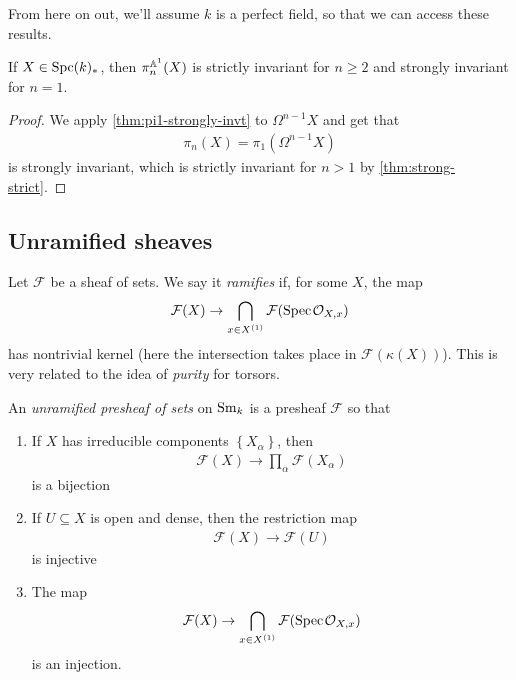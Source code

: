 \documentclass[11pt,openany]{book}
\begin{document}
\begin{assumption} From here on out, we'll assume $k$ is a perfect field, so that we can access these results.
\end{assumption}


\begin{corollary} If $X\in \mathrm{Spc}(k)_\ast$, then $\pi_n^{\mathbb{A}^1}(X)$ is strictly invariant for $n\ge 2$ and strongly invariant for $n=1$.
\end{corollary}
\begin{proof} We apply \autoref{thm:pi1-strongly-invt} to $\Omega^{n-1}X$ and get that
\begin{align*}
    \pi_n(X) = \pi_1(\Omega^{n-1} X)
\end{align*}
is strongly invariant, which is strictly invariant for $n>1$ by \autoref{thm:strong-strict}.
\end{proof}




\subsection{Unramified sheaves}



Let $\mathcal{F}$ be a sheaf of sets. We say it \textit{ramifies} if, for some $X$, the map
\begin{align*}
    \mathcal{F}(X) \to \bigcap_{x\in X^{(1)}} \mathcal{F}(\text{Spec}\hspace{0.1em} \mathcal{O}_{X,x})
\end{align*}
has nontrivial kernel (here the intersection takes place in $\mathcal{F}(\kappa(X))$). This is very related to the idea of \textit{purity} for torsors.

\begin{definition} \cite[2.1]{Morel} An \textit{unramified presheaf of sets} on $\mathrm{Sm}_k$ is a presheaf $\mathcal{F}$ so that
\begin{enumerate}
    \item If $X$ has irreducible components $\left\{ X_\alpha \right\}$, then
    \begin{align*}
        \mathcal{F}(X) \to \prod_\alpha \mathcal{F}(X_\alpha)
    \end{align*}
    is a bijection
    \item If $U \subseteq X$ is open and dense, then the restriction map
    \begin{align*}
        \mathcal{F}(X) \to \mathcal{F}(U)
    \end{align*}
    is injective
    \item The map
    \begin{align*}
        \mathcal{F}(X) \to\bigcap_{x\in X^{(1)}} \mathcal{F}(\text{Spec}\hspace{0.1em} \mathcal{O}_{X,x})
    \end{align*}
    is an injection.
\end{enumerate}
\end{definition}
\end{document}
